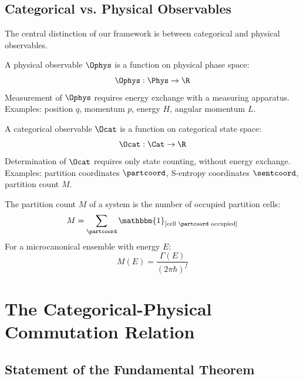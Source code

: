 \subsection{Categorical vs. Physical Observables}

The central distinction of our framework is between categorical and physical observables.

\begin{definition}
\label{def:physical_observable}
A physical observable $\Ophys$ is a function on physical phase space:
\begin{equation}
\Ophys: \Phys \to \R
\end{equation}
Measurement of $\Ophys$ requires energy exchange with a measuring apparatus. Examples: position $q$, momentum $p$, energy $H$, angular momentum $L$.
\end{definition}

\begin{definition}
\label{def:categorical_observable}
A categorical observable $\Ocat$ is a function on categorical state space:
\begin{equation}
\Ocat: \Cat \to \R
\end{equation}
Determination of $\Ocat$ requires only state counting, without energy exchange. Examples: partition coordinates $\partcoord$, S-entropy coordinates $\sentcoord$, partition count $M$.
\end{definition}

\begin{definition}
\label{def:partition_count}
The partition count $M$ of a system is the number of occupied partition cells:
\begin{equation}
M = \sum_{\partcoord} \mathbbm{1}_{[\text{cell } \partcoord \text{ occupied}]}
\end{equation}
For a microcanonical ensemble with energy $E$:
\begin{equation}
M(E) = \frac{\Gamma(E)}{(2\pi\hbar)^f}
\label{eq:partition_count}
\end{equation}
\end{definition}

\section{The Categorical-Physical Commutation Relation}

\subsection{Statement of the Fundamental Theorem}

